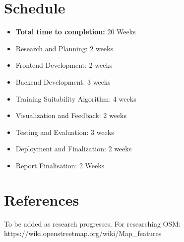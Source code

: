 \documentclass{article}
\begin{document}
\section{Schedule}
\begin{itemize}
  \item \textbf{Total time to completion:} 20 Weeks
  \item Research and Planning: 2 weeks
  \item Frontend Development: 2 weeks
  \item Backend Development: 3 weeks
  \item Training Suitability Algorithm: 4 weeks
  \item Visualization and Feedback: 2 weeks
  \item Testing and Evaluation: 3 weeks
  \item Deployment and Finalization: 2 weeks
  \item Report Finalisation: 2 Weeks
\end{itemize}

\section{References}
To be added as research progresses.
For researching OSM: https://wiki.openstreetmap.org/wiki/Map_features\\
\end{document}
